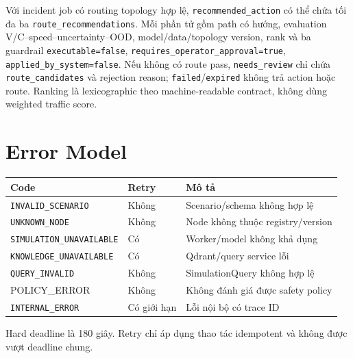 Với incident job có routing topology hợp lệ, \texttt{recommended\_action} có thể
chứa tối đa ba \texttt{route\_recommendations}. Mỗi phần tử gồm path có hướng,
evaluation V/C--speed--uncertainty--OOD, model/data/topology version, rank và ba
guardrail \texttt{executable=false},
\texttt{requires\_operator\_approval=true},
\texttt{applied\_by\_system=false}. Nếu không có route pass,
\texttt{needs\_review} chỉ chứa \texttt{route\_candidates} và rejection reason;
\texttt{failed}/\texttt{expired} không trả action hoặc route. Ranking là
lexicographic theo machine-readable contract, không dùng weighted traffic score.

\section{Error Model}

{\small
\begin{longtable}{p{4cm} p{2cm} p{8cm}}
\toprule
\textbf{Code} & \textbf{Retry} & \textbf{Mô tả} \\
\midrule
\texttt{INVALID\_}\newline\texttt{SCENARIO} & Không & Scenario/schema không hợp lệ \\
\texttt{UNKNOWN\_NODE} & Không & Node không thuộc registry/version \\
\texttt{SIMULATION\_}\newline\texttt{UNAVAILABLE} & Có & Worker/model không khả dụng \\
\texttt{KNOWLEDGE\_}\newline\texttt{UNAVAILABLE} & Có & Qdrant/query service lỗi \\
\texttt{QUERY\_INVALID} & Không & SimulationQuery không hợp lệ \\
POLICY\_ERROR & Không & Không đánh giá được safety policy \\
\texttt{INTERNAL\_ERROR} & Có giới hạn & Lỗi nội bộ có trace ID \\
\bottomrule
\end{longtable}
}

Hard deadline là 180 giây. Retry chỉ áp dụng thao tác idempotent và không được vượt deadline chung.
